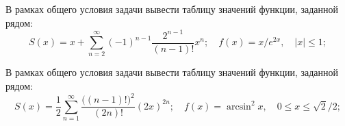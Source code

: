 
\begin{zztask}
В рамках общего условия задачи вывести таблицу значений функции, заданной рядом:
\[
  S(x)= x + \sum_{n=2}^\infty (-1)^{n-1}\frac{2^{n-1}}{(n-1)!} x^n;\quad
  f(x)= x/e^{2x},
  \quad |x| \leq 1;
\]
\end{zztask}


\begin{zztask}
В рамках общего условия задачи вывести таблицу значений функции, заданной рядом:
\[
  S(x)= \frac{1}{2} \sum_{n=1}^\infty \frac{\big((n-1)!\big)^2}{(2n)!} (2x)^{2n};\quad
  f(x)= \arcsin^2x,
  \quad 0 \leq x \leq \sqrt2/2;
\]
\end{zztask}


